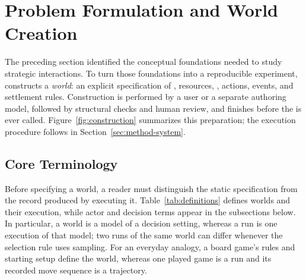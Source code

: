 \section{Problem Formulation and World Creation}\label{sec:world-creation}
The preceding section identified the conceptual foundations needed to study
strategic interactions. To turn those foundations into a reproducible
experiment, constructs a \textit{world}: an explicit specification of ,
resources, ,
actions, events, and settlement rules. Construction is performed by a user or a
separate authoring model, followed by structural checks and human review, and
finishes before the  is ever called.
Figure~\ref{fig:construction} summarizes this preparation; the execution
procedure follows in Section~\ref{sec:method-system}.

\subsection{Core Terminology}
Before specifying a world, a reader must distinguish the static specification
from the record produced by executing it. Table~\ref{tab:definitions} defines
worlds and their execution, while actor and decision terms appear in the
subsections below. In particular, a world is a model of a decision setting,
whereas a run is one execution of that model; two runs of the same world can
differ whenever the selection rule uses sampling. For an everyday
analogy, a board game's rules and starting setup define the world, whereas one
played game is a run and its recorded move sequence is a trajectory.

